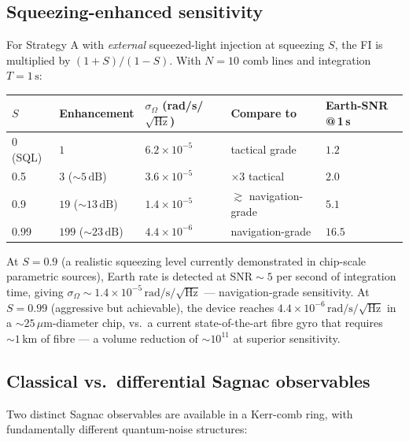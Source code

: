 \documentclass[11pt]{article}
\begin{document}
\subsection{Squeezing-enhanced sensitivity}
\label{sec:example_enhanced}

For Strategy A with \emph{external} squeezed-light injection at
squeezing $S$, the FI is multiplied by $(1+S)/(1-S)$.  With $N=10$
comb lines and integration $T=1\,\mathrm{s}$:
\begin{center}\small
\begin{tabular}{lllll}
\toprule
$S$ & Enhancement & $\sigma_\Omega$ (rad/s/$\sqrt{\mathrm{Hz}}$) & Compare to & Earth-SNR\,@\,1\,s\\
\midrule
0 (SQL) & $1$ & $6.2\times 10^{-5}$ & tactical grade & $1.2$ \\
0.5 & $3$ ($\sim 5\,\mathrm{dB}$) & $3.6\times 10^{-5}$ & $\times 3$ tactical & $2.0$ \\
0.9 & $19$ ($\sim 13\,\mathrm{dB}$) & $1.4\times 10^{-5}$ & $\gtrsim$ navigation-grade & $5.1$ \\
0.99 & $199$ ($\sim 23\,\mathrm{dB}$) & $4.4\times 10^{-6}$ & navigation-grade & $16.5$ \\
\bottomrule
\end{tabular}
\end{center}

At $S=0.9$ (a realistic squeezing level currently demonstrated in
chip-scale parametric sources), Earth rate is detected at SNR$\!\sim\!5$
per second of integration time, giving
$\sigma_\Omega\!\sim\!1.4\times 10^{-5}\,\mathrm{rad/s}/\sqrt{\mathrm{Hz}}$ ---
navigation-grade sensitivity.  At $S=0.99$ (aggressive but
achievable), the device reaches $4.4\times 10^{-6}\,\mathrm{rad/s}/\sqrt{\mathrm{Hz}}$
in a $\sim\!25\,\mu\mathrm{m}$-diameter chip, vs.\ a current
state-of-the-art fibre gyro that requires $\sim\!1\,\mathrm{km}$ of
fibre --- a volume reduction of $\sim\!10^{11}$ at superior
sensitivity.

\subsection{Classical vs.\ differential Sagnac observables}
\label{sec:classical_vs_diff}

Two distinct Sagnac observables are available in a Kerr-comb ring,
with fundamentally different quantum-noise structures:
\end{document}
